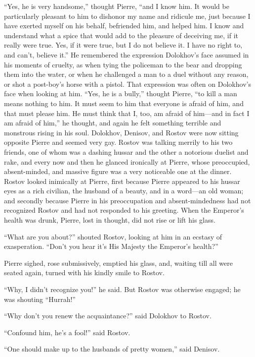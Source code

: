``Yes, he is very handsome,'' thought Pierre, ``and I know
him. It would be particularly pleasant to him to dishonor my name
and ridicule me, just because I have exerted myself on his
behalf, befriended him, and helped him. I know and understand
what a spice that would add to the pleasure of deceiving me, if
it really were true. Yes, if it were true, but I do not believe
it. I have no right to, and can't, believe it.'' He remembered
the expression Dolokhov's face assumed in his moments of cruelty,
as when tying the policeman to the bear and dropping them into
the water, or when he challenged a man to a duel without any
reason, or shot a post-boy's horse with a pistol. That expression
was often on Dolokhov's face when looking at him. ``Yes, he is a
bully,'' thought Pierre, ``to kill a man means nothing to him. It
must seem to him that everyone is afraid of him, and that must
please him. He must think that I, too, am afraid of him---and in
fact I am afraid of him,'' he thought, and again he felt
something terrible and monstrous rising in his soul.  Dolokhov,
Denisov, and Rostov were now sitting opposite Pierre and seemed
very gay. Rostov was talking merrily to his two friends, one of
whom was a dashing hussar and the other a notorious duelist and
rake, and every now and then he glanced ironically at Pierre,
whose preoccupied, absent-minded, and massive figure was a very
noticeable one at the dinner. Rostov looked inimically at Pierre,
first because Pierre appeared to his hussar eyes as a rich
civilian, the husband of a beauty, and in a word---an old woman;
and secondly because Pierre in his preoccupation and
absent-mindedness had not recognized Rostov and had not responded
to his greeting. When the Emperor's health was drunk, Pierre,
lost in thought, did not rise or lift his glass.

``What are you about?'' shouted Rostov, looking at him in an
ecstasy of exasperation. ``Don't you hear it's His Majesty the
Emperor's health?''

Pierre sighed, rose submissively, emptied his glass, and, waiting
till all were seated again, turned with his kindly smile to
Rostov.

``Why, I didn't recognize you!'' he said. But Rostov was
otherwise engaged; he was shouting ``Hurrah!''

``Why don't you renew the acquaintance?'' said Dolokhov to
Rostov.

``Confound him, he's a fool!'' said Rostov.

``One should make up to the husbands of pretty women,'' said
Denisov.

